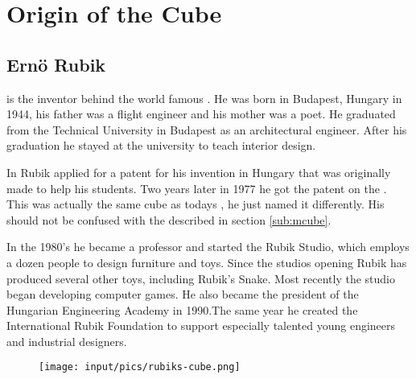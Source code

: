 \chapter{Origin of the Cube}

\section{Ern\"{o} Rubik}
\erno{} is the inventor behind the world famous \rubik{}. He was born in Budapest, Hungary in 1944, his father was a flight engineer and his mother was a poet. He graduated from the Technical University in Budapest as an architectural engineer. After his graduation he stayed at the university to teach interior design.

In  Rubik applied for a patent for his invention in Hungary that was originally made to help his students. Two years later in 1977 he got the patent on the \mcube{}. This \mcube{} was actually the same cube as todays \rubik{}, he just named it differently. His \mcube{} should not be confused with the \mcube{} described in section \ref{sub:mcube}.

In the 1980's he became a professor and started the Rubik Studio, which employs a dozen people to design furniture and toys. 
Since the studios opening Rubik has produced several other toys, including Rubik's Snake. Most recently  the studio began developing computer games. 
He also became the president of the Hungarian Engineering Academy in 1990.The same year he created the International Rubik Foundation to support especially talented young engineers and industrial designers.

\begin{figure}
	\centering
		\texttt{[image: input/pics/rubiks-cube.png]}
	\caption{}
	\label{fig:rubiks-cube}
\end{figure}
 
